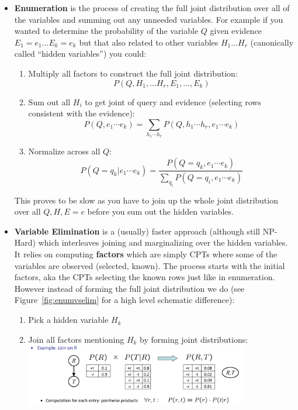 \documentclass[11pt]{article}
\begin{document}
\begin{itemize}
    \item \textbf{Enumeration} is the process of creating the full joint distribution over all of the variables and summing out any unneeded variables. For example if you wanted to determine the probability of the variable $Q$ given evidence $E_1=e_1 \ldots E_k = e_k$ but that also related to other variables $H_1 \ldots H_r$ (canonically called ``hidden variables'') you could:
    \begin{enumerate}
        \item Multiply all factors to construct the full joint distribution:
        $$P(Q, H_1, \dots H_r, E_1, \dots, E_k)$$
        \item Sum out all $H_i$ to get joint of query and evidence (selecting rows consistent with the evidence):
        $$P(Q, e_1 \cdots e_k) = \sum_{h_1 \cdots h_r} P(Q, h_1 \cdots h_r, e_1 \cdots e_k)$$
        \item Normalize across all $Q$:
        $$P(Q=q_k | e_1 \cdots e_k) = \frac{P(Q=q_k, e_1 \cdots e_k)}{\sum_{q_i} P(Q=q_i, e_1 \cdots e_k)}$$
    \end{enumerate}
    This proves to be slow as you have to join up the whole joint distribution over all $Q,H,E=e$ before you sum out the hidden variables.
    \item \textbf{Variable Elimination} is a (usually) faster approach (although still NP-Hard) which interleaves joining and marginalizing over the hidden variables. It relies on computing \textbf{factors} which are simply CPTs where some of the variables are observed (selected, known). The process starts with the initial factors, aka the CPTs selecting the known rows just like in enumeration. However instead of forming the full joint distribution we do (see Figure~\ref{fig:enumvselim} for a high level schematic difference):
    \begin{enumerate}
        \item Pick a hidden variable $H_k$
        \item Join all factors mentioning $H_k$ by forming joint distributions:\\
        \includegraphics[width=0.8\textwidth]{figs/join.png}

\end{enumerate}
\end{itemize}
\end{document}
